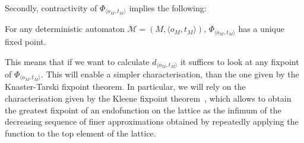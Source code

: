 Secondly, contractivity of $\Phi_{\langle o_M, t_M\rangle}$ implies the following:
\begin{corollary}\label{c2:lem:uniquefp}
    For any deterministic automaton $\mathcal{M} = (M, \langle o_M, t_M\rangle)$, $\Phi_{\langle o_M, t_M\rangle}$ has a unique fixed point.
\end{corollary}
This means that if we want to calculate $d_{\langle o_M, t_M\rangle}$ it suffices to look at any fixpoint of $\Phi_{\langle o_M, t_M\rangle}$. This will enable a simpler characterisation, than the one given by the Knaster-Tarski fixpoint theorem. In particular, we will rely on the characterisation given by the Kleene fixpoint theorem~\cite[Theorem~2.8.5]{Sangiorgi:2011:Coinduction}, which allows to obtain the greatest fixpoint of an endofunction on the lattice as the infimum of the decreasing sequence of finer approximations obtained by repeatedly applying the function to the top element of the lattice.

